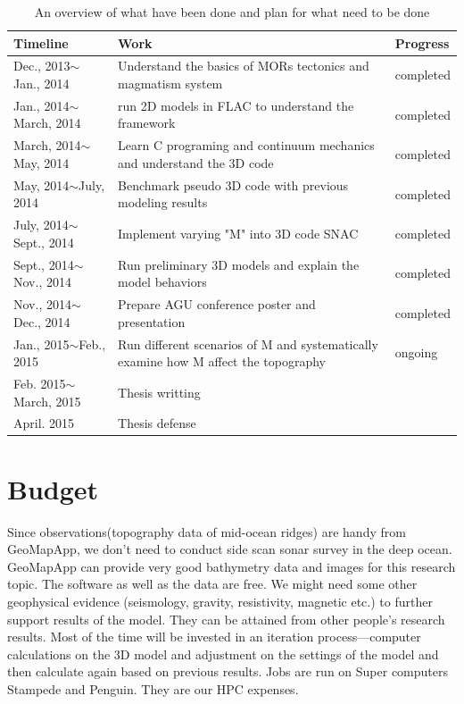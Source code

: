 \documentclass[12pt]{article}
\begin{document}
\begin{table}[hc]
\begin{small}
\begin{center}
\begin{tabular}{|l|p{7cm}|l|}
\hline
Timeline & Work & Progress\\
\hline
Dec., 2013$\sim$Jan., 2014& Understand the basics of MORs tectonics and magmatism system & completed\\ \hline
Jan., 2014$\sim$March, 2014& run 2D models in FLAC to understand the framework& completed\\ \hline
March, 2014$\sim$May, 2014& Learn C programing and continuum mechanics and understand the 3D code& completed\\ \hline
May, 2014$\sim$July, 2014& Benchmark pseudo 3D code with previous modeling results& completed\\ \hline
July, 2014$\sim$Sept., 2014& Implement varying "M" into 3D code SNAC& completed\\ \hline
Sept., 2014$\sim$Nov., 2014& Run preliminary 3D models and explain the model behaviors& completed\\ \hline
Nov., 2014$\sim$Dec., 2014& Prepare AGU conference poster and presentation& completed\\ \hline

Jan., 2015$\sim$Feb., 2015  & Run different scenarios of M and systematically examine how M affect the topography & ongoing\\ \hline
Feb. 2015$\sim$March, 2015 & Thesis writting & \\ \hline
April. 2015 & Thesis defense & \\ \hline
\end{tabular}
\end{center}
\end{small}
\caption{An overview of what have been done and plan for what need to be done}
\label{tab:plan}
\end{table}

\pagebreak
\section{Budget}
\label{ch:budget}
Since observations(topography data of mid-ocean ridges) are handy from GeoMapApp, we don’t need to conduct side scan sonar survey in the deep ocean. GeoMapApp can provide very good bathymetry data and images for this research topic. The software as well as the data are free. We might need some other geophysical evidence (seismology, gravity, resistivity, magnetic etc.) to further support results of the model. They can be attained from other people’s research results. Most of the time will be invested in an iteration process—computer calculations on the 3D model and adjustment on the settings of the model and then calculate again based on previous results. Jobs are run on Super computers Stampede and Penguin. They are our HPC expenses.


\break
\begin{footnotesize}




\end{footnotesize}
\end{document}

